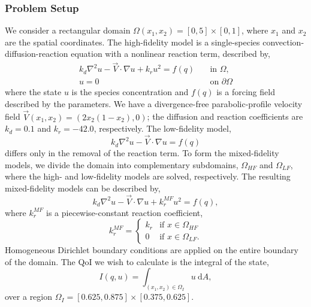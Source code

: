 \subsubsection{Problem Setup} \label{sec:cdvcdrSetup}
%
We consider a rectangular domain $\Omega(x_1,x_2)=[0,5]\times[0,1]$, where $x_1$ and $x_2$ are the spatial coordinates. The high-fidelity model is a single-species convection-diffusion-reaction equation with a nonlinear reaction term, described by,
%
\begin{subequations}
\label{eq:cdvcdrHF}
\begin{align}
k_d\nabla^2 u - \vec{V}\cdot\nabla u + k_ru^2 = f(q) \quad &\text{in } \Omega, \label{eq:cdvcdrHF_int} \\
u = 0 \quad &\text{on } \partial \Omega \label{eq:cdvcdrHF_bdry}
\end{align} 
\end{subequations}
%
where the state $u$ is the species concentration and $f(q)$ is a forcing field described by the parameters. We have a divergence-free parabolic-profile velocity field $\vec{V}(x_1,x_2) = (2x_2(1-x_2),0)$; the diffusion and reaction coefficients are $k_d = 0.1$ and $k_r = -42.0$, respectively. The low-fidelity model,
%
\begin{equation}
k_d\nabla^2 u - \vec{V}\cdot\nabla u = f(q)
\end{equation}
%
differs only in the removal of the reaction term. To form the mixed-fidelity models, we divide the domain into complementary subdomains, $\Omega_{HF}$ and $\Omega_{LF}$, where the high- and low-fidelity models are solved, respectively. The resulting mixed-fidelity models can be described by, 
%
\begin{equation}
k_d\nabla^2 u - \vec{V}\cdot\nabla u + k^{MF}_ru^2= f(q),
\end{equation}
%
where $k^{MF}_r$ is a piecewise-constant reaction coefficient,
%
\begin{equation}
k^{MF}_r=
\begin{cases}
k_r & \textrm{if }x\in\Omega_{HF} \\
0 & \textrm{if }x\in\Omega_{LF}.
\end{cases}
\end{equation}
%
Homogeneous Dirichlet boundary conditions are applied on the entire boundary of the domain. The QoI we wish to calculate is the integral of the state,
%
\begin{equation}
I(q,u)=\int_{(x_1,x_2)\in \Omega_I} u \:\textrm{d}A,
\end{equation}
%
over a region $\Omega_I=[0.625,0.875]\times[0.375,0.625]$. 


